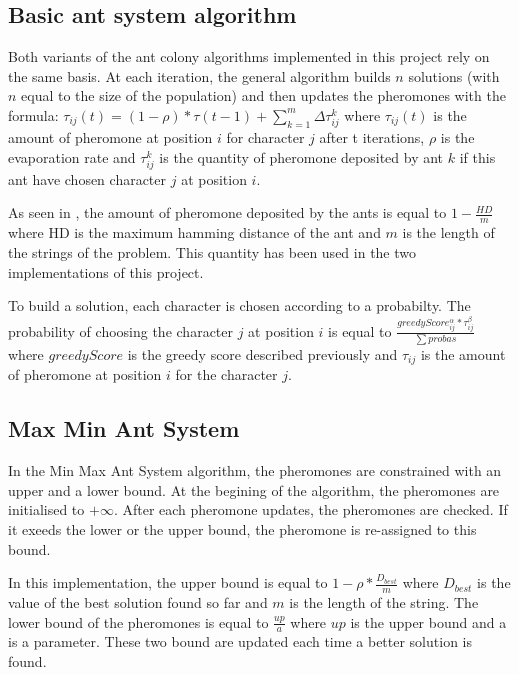 \documentclass{article}
\begin{document}
\subsection{Basic ant system algorithm}

Both variants of the ant colony algorithms implemented in this project rely on the same basis.
At each iteration, the general algorithm builds $n$ solutions (with $n$ equal to the size of the population) and then updates the pheromones with the formula: $\tau_{ij}(t) = (1-\rho)*\tau(t-1) + \sum \limits_{k=1}^m \Delta \tau_{ij}^k$  where $\tau_{ij}(t)$ is the amount of pheromone at position $i$ for character $j$ after t iterations, $\rho$ is the evaporation rate and $\tau_{ij}^k$ is the quantity of pheromone deposited by ant $k$ if this ant have chosen character $j$ at position $i$. \newline

As seen in \cite{aco_csp}, the amount of pheromone deposited by the ants is equal to $1-\frac{HD}{m}$ where HD is the maximum hamming distance of the ant and $m$ is the length of the strings of the problem.
This quantity has been used in the two implementations of this project. \newline

To build a solution, each character is chosen according to a probabilty.
The probability of choosing the character $j$ at position $i$ is equal to $ \frac{greedyScore_{ij}^{\alpha} * \tau_{ij}^{\beta}}{\sum probas}$ where $greedyScore$ is the greedy score described previously and $\tau_{ij}$ is the amount of pheromone at position $i$ for the character $j$.


\subsection{Max Min Ant System}

In the Min Max Ant System algorithm, the pheromones are constrained with an upper and a lower bound.
At the begining of the algorithm, the pheromones are initialised to $+\infty$.
After each pheromone updates, the pheromones are checked.
If it exeeds the lower or the upper bound, the pheromone is re-assigned to this bound. \newline

In this implementation, the upper bound is equal to $1-\rho*\frac{D_{best}}{m}$ where $D_{best}$ is the value of the best solution found so far and $m$ is the length of the string.
The lower bound of the pheromones is equal to $\frac{up}{a}$ where $up$ is the upper bound and a is a parameter.
These two bound are updated each time a better solution is found.\newline
\end{document}
